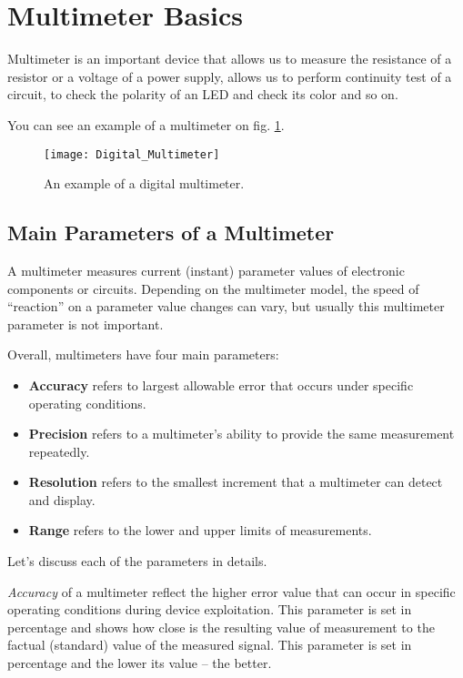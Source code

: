 \documentclass[../main.tex]{subfiles}
\begin{document}
\section{Multimeter Basics}

Multimeter is an important device that allows us to measure the resistance of a
resistor or a voltage of a power supply, allows us to perform continuity test of
a circuit, to check the polarity of an LED and check its color and so on.

You can see an example of a multimeter on fig. \ref{fig:multimeter-example}.

\begin{figure}[ht]
  \centering
  \texttt{[image: Digital\_Multimeter]}
  \caption{An example of a digital multimeter.}
  \label{fig:multimeter-example}
\end{figure}

\subsection{Main Parameters of a Multimeter}

A multimeter measures current (instant) parameter values of electronic
components or circuits.  Depending on the multimeter model, the speed of
``reaction'' on a parameter value changes can vary, but usually this multimeter
parameter is not important.

Overall, multimeters have four\cite{fluke:multimeter} main parameters:
\begin{itemize}
\item \textbf{Accuracy} refers to largest allowable error that occurs under
  specific operating conditions.
\item \textbf{Precision} refers to a multimeter's ability to provide the same
  measurement repeatedly.
\item \textbf{Resolution} refers to the smallest increment that a multimeter can
  detect and display.
\item \textbf{Range} refers to the lower and upper limits of measurements.
\end{itemize}

Let's discuss each of the parameters in details.

\emph{Accuracy} of a multimeter reflect the higher error value that can occur in
specific operating conditions during device exploitation.  This parameter is set
in percentage and shows how close is the resulting value of measurement to the
factual (standard) value of the measured signal.  This parameter is set in
percentage and the lower its value -- the better.
\end{document}
